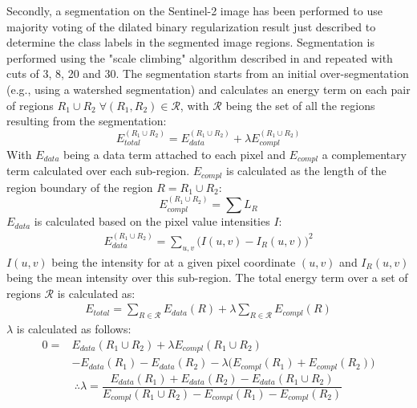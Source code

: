 \documentclass[10pt]{article}
\begin{document}
Secondly, a segmentation on the Sentinel-2 image has been performed to use majority voting of the dilated binary regularization result just described to determine the class labels in the segmented image regions. Segmentation is performed using the "scale climbing" algorithm described in \cite{guigues_scale-sets_2003} and repeated with cuts of 3, 8, 20 and 30. The segmentation starts from an initial over-segmentation (e.g., using a watershed segmentation) and calculates an energy term on each pair of regions $R_1\cup R_2\;\forall (R_1,R_2)\in\mathcal{R}$, with $\mathcal{R}$ being the set of all the regions resulting from the segmentation:
\begin{equation}
    E_{total}^{(R_1\cup R_2)}=E_{data}^{(R_1\cup R_2)}+\lambda E_{compl}^{(R_1\cup R_2)}
\end{equation}
With $E_{data}$ being a data term attached to each pixel and $E_{compl}$ a complementary term calculated over each sub-region.
$E_{compl}$ is calculated as the length of the region boundary of the region $R=R_1\cup R_2$:
\begin{equation}
    E^{(R_1\cup R_2)}_{compl}=\sum L_R
\end{equation}
$E_{data}$ is calculated based on the pixel value intensities $I$:
\begin{align}
    E_{data}^{(R_1\cup R_2)}=\sum_{u,v}\big(I(u,v)-I_R(u,v)\big)^2
\end{align}
$I(u,v)$ being the intensity for at a given pixel coordinate $(u,v)$ and $I_R(u,v)$ being the mean intensity over this sub-region. The total energy term over a set of regions $\mathcal{R}$ is calculated as:
\begin{align}
    E_{total}=\sum_{R\in \mathcal{R}} E_{data}(R)+\lambda\sum_{R\in \mathcal{R}} E_{compl}(R)
\end{align}
$\lambda$ is calculated as follows:
\begin{equation}
    \begin{split}
    0=&E_{data}(R_1\cup R_2)+\lambda E_{compl}(R_1\cup R_2)\\
    &-E_{data}(R_1)-E_{data}(R_2)-\lambda\big(E_{compl}(R_1)+E_{compl}(R_2)\big)
    \end{split}
\end{equation}
\begin{equation}
    \therefore \lambda=\frac{E_{data}(R_1)+E_{data}(R_2)-E_{data}(R_1\cup R_2)}{E_{compl}(R_1\cup R_2) -E_{compl}(R_1)-E_{compl}(R_2)}
\end{equation}
\end{document}

